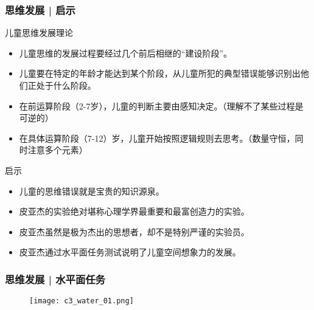 \begin{frame}
  \frametitle{思维发展 | 启示}
  \begin{block}{儿童思维发展理论}
    \begin{itemize}
      \item 儿童思维的发展过程要经过几个前后相继的“建设阶段”。
      \item 儿童要在特定的年龄才能达到某个阶段，从儿童所犯的典型错误能够识别出他们正处于什么阶段。
      \item 在前运算阶段（2-7岁），儿童的判断主要由感知决定。（理解不了某些过程是可逆的）
      \item 在具体运算阶段（7-12）岁，儿童开始按照逻辑规则去思考。（数量守恒，同时注意多个元素）
    \end{itemize}
  \end{block}
  \pause
  \begin{block}{启示}
    \begin{itemize}
      \item 儿童的思维错误就是宝贵的知识源泉。
      \item 皮亚杰的实验绝对堪称心理学界最重要和最富创造力的实验。
      \item 皮亚杰虽然是极为杰出的思想者，却不是特别严谨的实验员。
      \item 皮亚杰通过水平面任务测试说明了儿童空间想象力的发展。
    \end{itemize}
  \end{block}
\end{frame}

\begin{frame}
  \frametitle{思维发展 | 水平面任务}
  \begin{figure}
    \centering
    \texttt{[image: c3\_water\_01.png]}
  \end{figure}
\end{frame}

